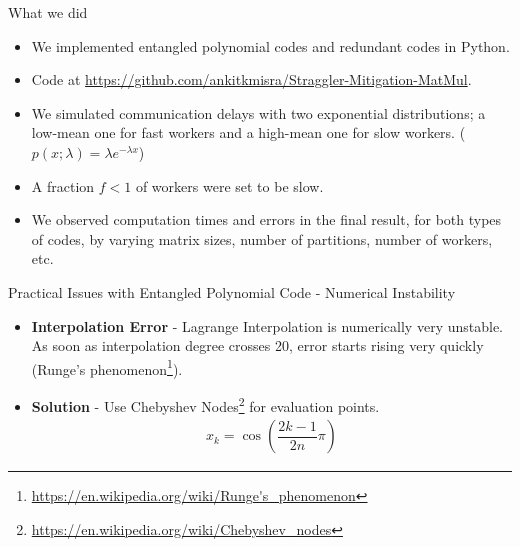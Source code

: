 \documentclass{beamer}
\begin{document}
\begin{frame}{What we did}
    \begin{itemize}
        \item We implemented entangled polynomial codes and redundant codes in Python.
        \item Code at \url{https://github.com/ankitkmisra/Straggler-Mitigation-MatMul}.
        \item We simulated communication delays with two exponential distributions; a low-mean one for fast workers and a high-mean one for slow workers. ($p(x;\lambda) = \lambda e^{-\lambda x}$)
        \item A fraction $f < 1$ of workers were set to be slow.
        \item We observed computation times and errors in the final result, for both types of codes, by varying matrix sizes, number of partitions, number of workers, etc.
    \end{itemize}
\end{frame}

\begin{frame}{Practical Issues with Entangled Polynomial Code - Numerical Instability}
    \begin{itemize}
        \item \textbf{Interpolation Error} - Lagrange Interpolation is numerically very unstable. As soon as interpolation degree crosses 20, error starts rising very quickly (Runge's phenomenon\footnote{\url{https://en.wikipedia.org/wiki/Runge's_phenomenon}}).
        \item \textbf{Solution} - Use Chebyshev Nodes\footnote{\url{https://en.wikipedia.org/wiki/Chebyshev_nodes}} for evaluation points. 
        \begin{align*}
            x_k = \cos\left(\dfrac{2k-1}{2n}\pi\right)
        \end{align*}
    \end{itemize}
\end{frame}
\end{document}

